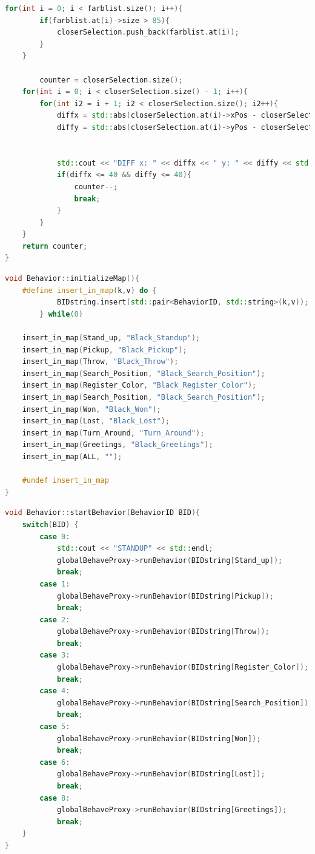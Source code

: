 \begin{appendix}
\begin{lstlisting}[language=c++,
                   caption={Funktion: "`getDiceValue''},
                   label={lst:getDiveValue1}]
    for(int i = 0; i < farblist.size(); i++){
        if(farblist.at(i)->size > 85){
            closerSelection.push_back(farblist.at(i));
        }
    }

        counter = closerSelection.size();
    for(int i = 0; i < closerSelection.size() - 1; i++){
        for(int i2 = i + 1; i2 < closerSelection.size(); i2++){
            diffx = std::abs(closerSelection.at(i)->xPos - closerSelection.at(i2)->xPos);
            diffy = std::abs(closerSelection.at(i)->yPos - closerSelection.at(i2)->yPos);


            std::cout << "DIFF x: " << diffx << " y: " << diffy << std::endl;
            if(diffx <= 40 && diffy <= 40){
                counter--;
                break;
            }
        }
    }
    return counter;
}
\end{lstlisting}

\begin{lstlisting}[language=c++,
                   caption={Behaviour Map},
                   label={lst:behmap}]
void Behavior::initializeMap(){
    #define insert_in_map(k,v) do {                                     \
            BIDstring.insert(std::pair<BehaviorID, std::string>(k,v));  \
        } while(0)

    insert_in_map(Stand_up, "Black_Standup");
    insert_in_map(Pickup, "Black_Pickup");
    insert_in_map(Throw, "Black_Throw");
    insert_in_map(Search_Position, "Black_Search_Position");
    insert_in_map(Register_Color, "Black_Register_Color");
    insert_in_map(Search_Position, "Black_Search_Position");
    insert_in_map(Won, "Black_Won");
    insert_in_map(Lost, "Black_Lost");
    insert_in_map(Turn_Around, "Turn_Around");
    insert_in_map(Greetings, "Black_Greetings");
    insert_in_map(ALL, "");

    #undef insert_in_map
}
\end{lstlisting}

\begin{lstlisting}[language=c++,
                   caption={Behaviour Enumerator},
                   label={lst:behstart}]
void Behavior::startBehavior(BehaviorID BID){
    switch(BID) {
        case 0:
            std::cout << "STANDUP" << std::endl;
            globalBehaveProxy->runBehavior(BIDstring[Stand_up]);
            break;
        case 1:
            globalBehaveProxy->runBehavior(BIDstring[Pickup]);
            break;
        case 2:
            globalBehaveProxy->runBehavior(BIDstring[Throw]);
            break;
        case 3:
            globalBehaveProxy->runBehavior(BIDstring[Register_Color]);
            break;
        case 4:
            globalBehaveProxy->runBehavior(BIDstring[Search_Position]);
            break;
        case 5:
            globalBehaveProxy->runBehavior(BIDstring[Won]);
            break;
        case 6:
            globalBehaveProxy->runBehavior(BIDstring[Lost]);
            break;
        case 8:
            globalBehaveProxy->runBehavior(BIDstring[Greetings]);
            break;
    }
}
\end{lstlisting}


\end{appendix}
